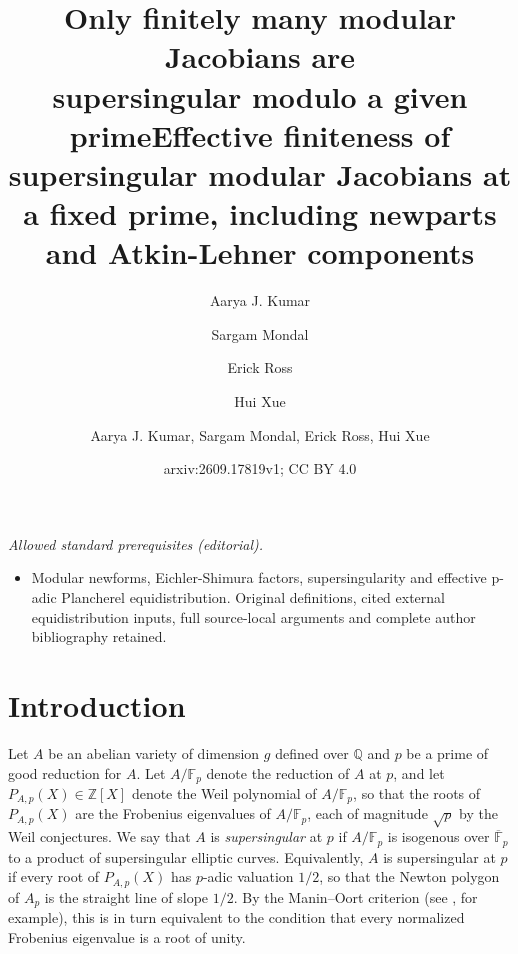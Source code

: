 \documentclass[11pt,letterpaper,reqno]{amsart}
\title{Only finitely many modular Jacobians are \\ supersingular modulo a given prime}
\author[A. J. Kumar]{Aarya J. Kumar}
\author[S. Mondal]{Sargam Mondal}
\author[E. Ross]{Erick Ross}
\author[H. Xue]{Hui Xue}
\title{Effective finiteness of supersingular modular Jacobians at a fixed prime, including newparts and Atkin-Lehner components}
\author{Aarya J. Kumar, Sargam Mondal, Erick Ross, Hui Xue}
\date{arxiv:2609.17819v1; CC BY 4.0}
\theoremstyle{definition}
\numberwithin{equation}{section}
\numberwithin{figure}{section}
\numberwithin{table}{section}
\begin{document}
\maketitle
\noindent\textit{Allowed standard prerequisites (editorial).}\begin{itemize}
\item Modular newforms, Eichler-Shimura factors, supersingularity and effective p-adic Plancherel equidistribution. Original definitions, cited external equidistribution inputs, full source-local arguments and complete author bibliography retained.
\end{itemize}\medskip
\section{Introduction}\label{section:introduction}



Let $A$ be an abelian variety of dimension $g$ defined over $\mathbb{Q}$ and $p$ be a prime of good reduction for $A$. Let $A/\mathbb{F}_p$ denote the reduction of $A$ at $p$, and let $P_{A,p}(X) \in \mathbb{Z}[X]$ denote the Weil polynomial of $A/\mathbb{F}_p$, so that the roots of $P_{A,p}(X)$ are the Frobenius eigenvalues of $A/\mathbb{F}_p$, each of magnitude $\sqrt{p}$ by the Weil conjectures. We say that $A$ is \emph{supersingular} at $p$ if $A/\mathbb{F}_p$ is isogenous over $\overline{\mathbb{F}}_p$ to a product of supersingular elliptic curves. Equivalently, $A$ is supersingular at $p$ if every root of $P_{A,p}(X)$ has $p$-adic valuation $1/2$, so that the Newton polygon of $A_p$ is the straight line of slope $1/2$. By the Manin--Oort criterion (see \cite[Section 1]{Ayotte2016}, for example), this is in turn equivalent to the condition that every normalized Frobenius eigenvalue is a root of unity. 
\end{document}
